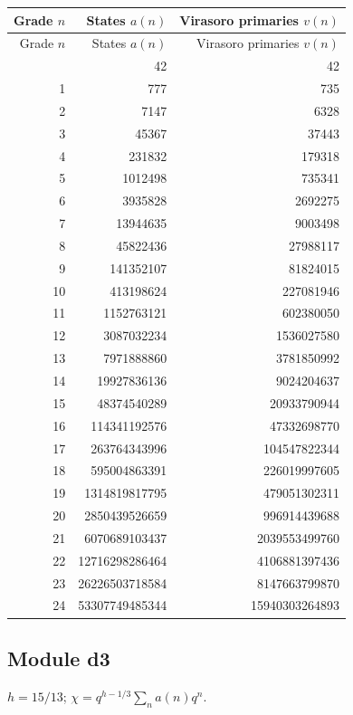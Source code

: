 \begingroup\small
\setlength{\tabcolsep}{5pt}
\begin{longtable}{@{}rrr@{}}
\toprule
Grade $n$ & States $a(n)$ & Virasoro primaries $v(n)$\\
\midrule\endfirsthead
\toprule
Grade $n$ & States $a(n)$ & Virasoro primaries $v(n)$\\
\midrule\endhead
\bottomrule\endfoot
0 & 42 & 42\\
1 & 777 & 735\\
2 & 7147 & 6328\\
3 & 45367 & 37443\\
4 & 231832 & 179318\\
5 & 1012498 & 735341\\
6 & 3935828 & 2692275\\
7 & 13944635 & 9003498\\
8 & 45822436 & 27988117\\
9 & 141352107 & 81824015\\
10 & 413198624 & 227081946\\
11 & 1152763121 & 602380050\\
12 & 3087032234 & 1536027580\\
13 & 7971888860 & 3781850992\\
14 & 19927836136 & 9024204637\\
15 & 48374540289 & 20933790944\\
16 & 114341192576 & 47332698770\\
17 & 263764343996 & 104547822344\\
18 & 595004863391 & 226019997605\\
19 & 1314819817795 & 479051302311\\
20 & 2850439526659 & 996914439688\\
21 & 6070689103437 & 2039553499760\\
22 & 12716298286464 & 4106881397436\\
23 & 26226503718584 & 8147663799870\\
24 & 53307749485344 & 15940303264893\\
\end{longtable}
\endgroup

\subsection{Module d3}
$h=15/13$; $\chi=q^{h-1/3}\sum_n a(n)q^n$.

